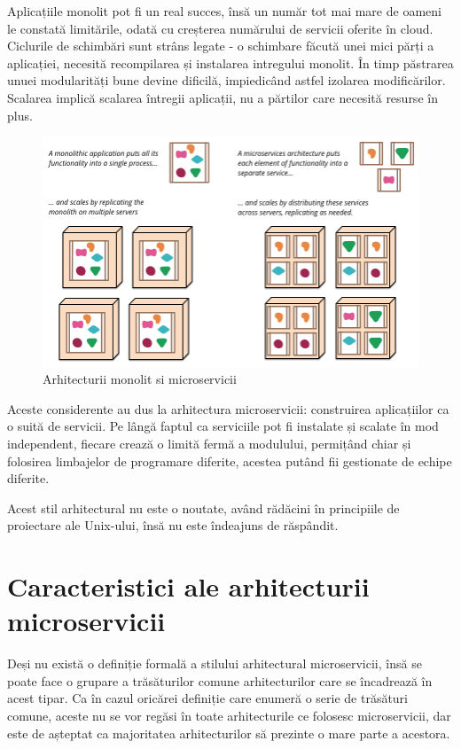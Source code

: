 \documentclass[12pt, a4paper, oneside, romanian]{teza-upb}
\begin{document}
Aplicațiile monolit pot fi un real succes, însă un număr tot mai mare de oameni le constată limitările, odată cu creșterea numărului de servicii oferite în cloud. Ciclurile de schimbări sunt strâns legate - o schimbare făcută unei mici părți a aplicației, necesită recompilarea și instalarea intregului monolit.  În timp păstrarea unuei modularități bune devine dificilă, impiedicând astfel izolarea modificărilor. Scalarea implică scalarea întregii aplicații, nu a părtilor care necesită resurse în plus.

\begin{figure}[ht]
\centering
\includegraphics[scale=0.3]{img/sketch.png}
\caption{Arhitecturii monolit si microservicii}
\label{fig:arhi_mono_micro}
\end{figure}

Aceste considerente au dus la arhitectura microservicii: construirea aplicațiilor ca o suită de servicii. Pe lângă faptul ca serviciile pot fi instalate și scalate în mod independent, fiecare crează o limită fermă a modulului, permițând chiar și folosirea limbajelor de programare diferite, acestea putând fii gestionate de echipe diferite.

Acest stil arhitectural nu este o noutate, având rădăcini în principiile de proiectare ale Unix-ului, însă nu este îndeajuns de răspândit.

\section{Caracteristici ale arhitecturii microservicii}

Deși nu există o definiție formală a stilului arhitectural microservicii, însă se poate face o grupare a trăsăturilor comune arhitecturilor care se încadrează în acest tipar. Ca în cazul oricărei definiție care enumeră o serie de trăsături comune, aceste nu se vor regăsi în toate arhitecturile ce folosesc microservicii, dar este de așteptat ca majoritatea arhitecturilor să  prezinte o mare parte a acestora.
\end{document}
